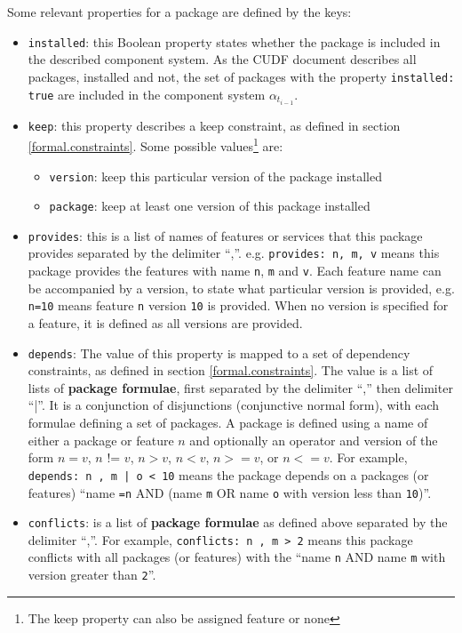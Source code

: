 Some relevant properties for a package are defined by the keys:
\begin{itemize}
  \item \verb+installed+: this Boolean property states whether the package is included in the described component system. 
  As the CUDF document describes all packages, installed and not, the set of packages with the property \verb+installed: true+ are included in the component system $\alpha_{t_{i-1}}$.
  \item \verb+keep+: this property describes a keep constraint, as defined in section \ref{formal.constraints}.
  Some possible values\footnote{The keep property can also be assigned feature or none} are:
	  	\begin{itemize}
	  		\item \verb+version+: keep this particular version of the package installed
	  		\item \verb+package+: keep at least one version of this package installed
		\end{itemize}
  \item \verb+provides+: this is a list of names of features or services that this package provides separated by the delimiter ``,''.
  e.g. \verb+provides: n, m, v+ means this package provides the features with name \verb+n+, \verb+m+ and \verb+v+.
  Each feature name can be accompanied by a version, to state what particular version is provided, e.g. \verb+n=10+ means feature \verb+n+ version \verb+10+ is provided.
  When no version is specified for a feature, it is defined as all versions are provided.
  \item \verb+depends+: The value of this property is mapped to a set of dependency constraints, as defined in section \ref{formal.constraints}.
  The value is a list of lists of \textbf{package formulae}, first separated by the delimiter ``,'' then delimiter ``|''.
  It is a conjunction of disjunctions (conjunctive normal form), with each formulae defining a set of packages.
  A package is defined using a name of either a package or feature $n$ and optionally an operator and version of the form  $n = v$, $n$ != $v$, $n > v$, $n < v$, $n >= v$, or $n <= v$.
  For example, \verb+depends: n , m | o < 10+ means the package depends on a packages (or features) ``name \verb+=n+ AND (name \verb+m+ OR name \verb+o+ with version less than \verb+10+)''.  
  \item \verb+conflicts+: is a list of \textbf{package formulae} as defined above separated by the delimiter ``,''.
  For example, \verb+conflicts: n , m > 2+ means this package conflicts with all packages (or features) with the ``name \verb+n+ AND name \verb+m+ with version greater than \verb+2+''.
\end{itemize}

